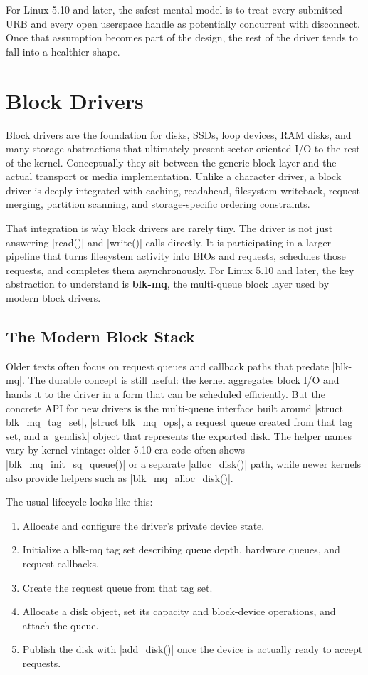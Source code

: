\documentclass[10pt, oneside]{book}
\begin{document}
For Linux 5.10 and later, the safest mental model is to treat every submitted URB and every
open userspace handle as potentially concurrent with disconnect.
Once that assumption becomes part of the design, the rest of the driver tends to
fall into a healthier shape.

\section{Block Drivers}
\label{sec:block}
Block drivers are the foundation for disks, SSDs, loop devices, RAM disks, and
many storage abstractions that ultimately present sector-oriented I/O to the
rest of the kernel.
Conceptually they sit between the generic block layer and the actual transport
or media implementation.
Unlike a character driver, a block driver is deeply integrated with caching,
readahead, filesystem writeback, request merging, partition scanning, and
storage-specific ordering constraints.

That integration is why block drivers are rarely tiny.
The driver is not just answering \cpp|read()| and \cpp|write()| calls directly.
It is participating in a larger pipeline that turns filesystem activity into
BIOs and requests, schedules those requests, and completes them asynchronously.
For Linux 5.10 and later, the key abstraction to understand is \textbf{blk-mq}, the
multi-queue block layer used by modern block drivers.

\subsection{The Modern Block Stack}
\label{sec:block_stack}
Older texts often focus on request queues and callback paths that predate
\cpp|blk-mq|.
The durable concept is still useful: the kernel aggregates block I/O and hands
it to the driver in a form that can be scheduled efficiently.
But the concrete API for new drivers is the multi-queue interface built around
\cpp|struct blk_mq_tag_set|, \cpp|struct blk_mq_ops|, a request queue created
from that tag set, and a \cpp|gendisk| object that represents the exported
disk.
The helper names vary by kernel vintage: older 5.10-era code often shows
\cpp|blk_mq_init_sq_queue()| or a separate \cpp|alloc_disk()| path, while newer
kernels also provide helpers such as \cpp|blk_mq_alloc_disk()|.

The usual lifecycle looks like this:
\begin{enumerate}
  \item Allocate and configure the driver's private device state.
  \item Initialize a blk-mq tag set describing queue depth, hardware queues, and request callbacks.
  \item Create the request queue from that tag set.
  \item Allocate a disk object, set its capacity and block-device operations, and attach the queue.
  \item Publish the disk with \cpp|add_disk()| once the device is actually ready to accept requests.
\end{enumerate}
\end{document}
